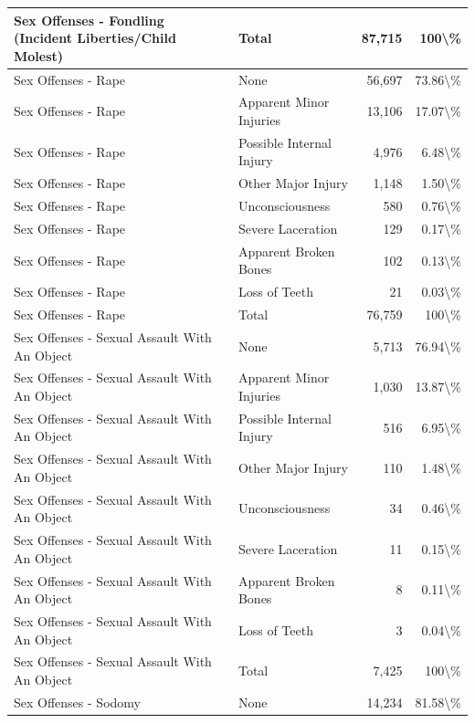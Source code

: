 \documentclass[
]{krantz}
\begin{document}
\begin{longtable}[t]{l|l|r|r}
\hline
Sex Offenses - Fondling (Incident Liberties/Child Molest) & Total & 87,715 & 100\textbackslash{}\%\\
\hline
Sex Offenses - Rape & None & 56,697 & 73.86\textbackslash{}\%\\
\hline
Sex Offenses - Rape & Apparent Minor Injuries & 13,106 & 17.07\textbackslash{}\%\\
\hline
Sex Offenses - Rape & Possible Internal Injury & 4,976 & 6.48\textbackslash{}\%\\
\hline
Sex Offenses - Rape & Other Major Injury & 1,148 & 1.50\textbackslash{}\%\\
\hline
Sex Offenses - Rape & Unconsciousness & 580 & 0.76\textbackslash{}\%\\
\hline
Sex Offenses - Rape & Severe Laceration & 129 & 0.17\textbackslash{}\%\\
\hline
Sex Offenses - Rape & Apparent Broken Bones & 102 & 0.13\textbackslash{}\%\\
\hline
Sex Offenses - Rape & Loss of Teeth & 21 & 0.03\textbackslash{}\%\\
\hline
Sex Offenses - Rape & Total & 76,759 & 100\textbackslash{}\%\\
\hline
Sex Offenses - Sexual Assault With An Object & None & 5,713 & 76.94\textbackslash{}\%\\
\hline
Sex Offenses - Sexual Assault With An Object & Apparent Minor Injuries & 1,030 & 13.87\textbackslash{}\%\\
\hline
Sex Offenses - Sexual Assault With An Object & Possible Internal Injury & 516 & 6.95\textbackslash{}\%\\
\hline
Sex Offenses - Sexual Assault With An Object & Other Major Injury & 110 & 1.48\textbackslash{}\%\\
\hline
Sex Offenses - Sexual Assault With An Object & Unconsciousness & 34 & 0.46\textbackslash{}\%\\
\hline
Sex Offenses - Sexual Assault With An Object & Severe Laceration & 11 & 0.15\textbackslash{}\%\\
\hline
Sex Offenses - Sexual Assault With An Object & Apparent Broken Bones & 8 & 0.11\textbackslash{}\%\\
\hline
Sex Offenses - Sexual Assault With An Object & Loss of Teeth & 3 & 0.04\textbackslash{}\%\\
\hline
Sex Offenses - Sexual Assault With An Object & Total & 7,425 & 100\textbackslash{}\%\\
\hline
Sex Offenses - Sodomy & None & 14,234 & 81.58\textbackslash{}\%\\

\end{longtable}
\end{document}
